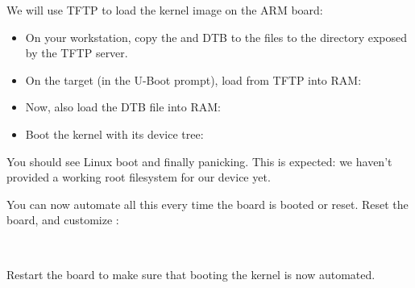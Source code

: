 We will use TFTP to load the kernel image on the ARM board:

\begin{itemize}

\item On your workstation, copy the  and DTB to the
files to the directory exposed by the TFTP server.

\item On the target (in the U-Boot prompt), load  from
TFTP into RAM:
{}
{}

\item Now, also load the DTB file into RAM:\\
{}
{}

\item Boot the kernel with its device tree:\\
{}
{}

\end{itemize}

You should see Linux boot and finally panicking. This is expected: we
haven't provided a working root filesystem for our device yet.

You can now automate all this every time the board is booted or
reset. Reset the board, and customize :

\scriptsize
{}
{
\\
}
\normalsize

Restart the board to make sure that booting the kernel is now automated.

